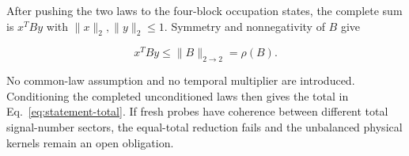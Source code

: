 After pushing the two laws to the four-block occupation states, the complete sum is $x^TBy$ with $\|x\|_2,\|y\|_2\le1$. Symmetry and nonnegativity of $B$ give

\begin{equation}
x^TBy\le\|B\|_{2\to2}=\rho(B).
\end{equation}

No common-law assumption and no temporal multiplier are introduced. Conditioning the completed unconditioned laws then gives the total in Eq.~\eqref{eq:statement-total}. If fresh probes have coherence between different total signal-number sectors, the equal-total reduction fails and the unbalanced physical kernels remain an open obligation.
